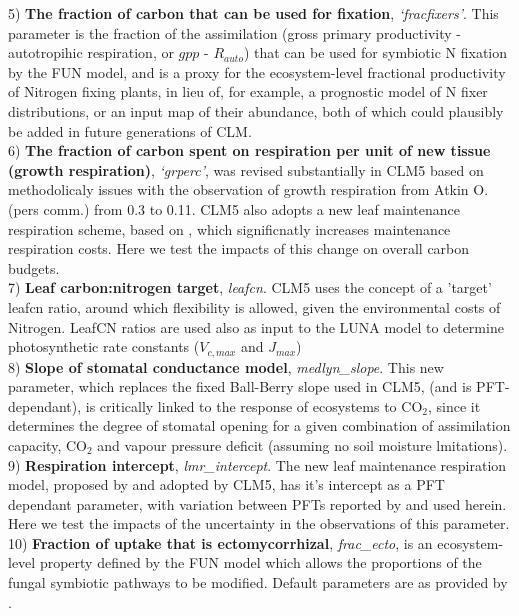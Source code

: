 \documentclass[draft,linenumbers]{agujournal}
\begin{document}
5) \textbf{The fraction of carbon that can be used for fixation}, \emph{`fracfixers'}. This parameter is the fraction of the assimilation (gross primary productivity - autotropihic respiration, or $gpp$ - $R_{auto}$) that can be used for symbiotic N fixation by the FUN model, and is a proxy for the ecosystem-level fractional productivity of Nitrogen fixing plants, in lieu of, for example, a prognostic model of N fixer distributions, or an input map of their abundance, both of which could plausibly be added in future generations of CLM. \\

6) \textbf{The fraction of carbon spent on respiration per unit of new tissue (growth respiration)}, \emph{`grperc'}, was revised substantially in CLM5 based on methodolicaly issues with the observation of growth respiration from Atkin O. (pers comm.) from 0.3 to 0.11. CLM5 also adopts a new leaf maintenance respiration scheme, based on \cite{atkin2015}, which significnatly increases maintenance respiration costs. Here we test the impacts of this change on overall carbon budgets.\\

7) \textbf{Leaf carbon:nitrogen target}, \emph{leafcn}. CLM5 uses the concept of a 'target' leafcn ratio, around which flexibility is allowed, given the environmental costs of Nitrogen. LeafCN ratios are used also as input to the LUNA model to determine photosynthetic rate constants ($V_{c,max}$ and $J_{max}$) \\

8) \textbf{Slope of stomatal conductance model}, \emph{medlyn\_slope}. This new parameter, which replaces the fixed Ball-Berry slope used in CLM5, (and is PFT-dependant), is critically linked to the response of ecosystems to CO$_{2}$, since it determines the degree of stomatal opening for a given combination of assimilation capacity, CO$_{2}$ and vapour pressure deficit (assuming no soil moisture lmitations).\\

9) \textbf{Respiration intercept}, \emph{lmr\_intercept}. The new leaf maintenance respiration model, proposed by \cite{atkin2015} and adopted by CLM5, has it's intercept as a PFT dependant parameter, with variation between PFTs reported by \cite{atkin2015} and used herein. Here we test the impacts of the uncertainty in the observations of this parameter. \\

10) \textbf{Fraction of uptake that is ectomycorrhizal}, \emph{frac\_ecto}, is an ecosystem-level property defined by the FUN model which allows the proportions of the fungal symbiotic pathways to be modified. Default parameters are as provided by \cite{shi2016}.\\
\end{document}
